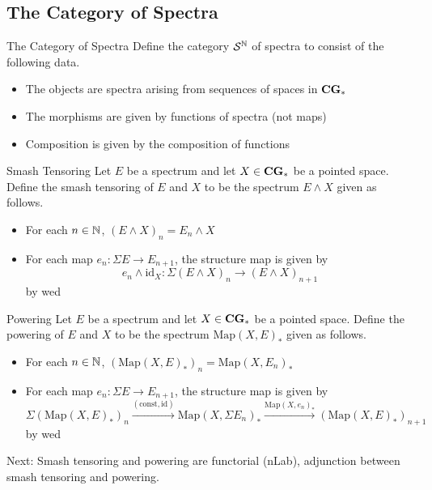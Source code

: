 \documentclass[a4paper]{article}
\begin{document}
\subsection{The Category of Spectra}
\begin{defn}{The Category of Spectra}{} Define the category $\mathcal{S}^{\mathbb{N}}$ of spectra to consist of the following data. 
\begin{itemize}
\item The objects are spectra arising from sequences of spaces in $\bold{CG}_\ast$
\item The morphisms are given by functions of spectra (not maps)
\item Composition is given by the composition of functions
\end{itemize}
\end{defn}

\begin{defn}{Smash Tensoring}{} Let $E$ be a spectrum and let $X\in\bold{CG}_\ast$ be a pointed space. Define the smash tensoring of $E$ and $X$ to be the spectrum $E\wedge X$ given as follows. 
\begin{itemize}
\item For each $n\in\mathbb{N}$, $(E\wedge X)_n=E_n\wedge X$
\item For each map $e_n:\Sigma E\to E_{n+1}$, the structure map is given by $$e_n\wedge\text{id}_X:\Sigma(E\wedge X)_n\to(E\wedge X)_{n+1}$$ by wed
\end{itemize}
\end{defn}

\begin{defn}{Powering}{} Let $E$ be a spectrum and let $X\in\bold{CG}_\ast$ be a pointed space. Define the powering of $E$ and $X$ to be the spectrum $\text{Map}(X,E)_\ast$ given as follows. 
\begin{itemize}
\item For each $n\in\mathbb{N}$, $(\text{Map}(X,E)_\ast)_n=\text{Map}(X,E_n)_\ast$
\item For each map $e_n:\Sigma E\to E_{n+1}$, the structure map is given by $$\Sigma(\text{Map}(X,E)_\ast)_n\overset{(\text{const},\text{id})}{\longrightarrow}\text{Map}(X,\Sigma E_n)_\ast\overset{\text{Map}(X,e_n)_\ast}{\longrightarrow}(\text{Map}(X,E)_\ast)_{n+1}$$ by wed
\end{itemize}
\end{defn}

Next: Smash tensoring and powering are functorial (nLab), adjunction between smash tensoring and powering. 
\end{document}
